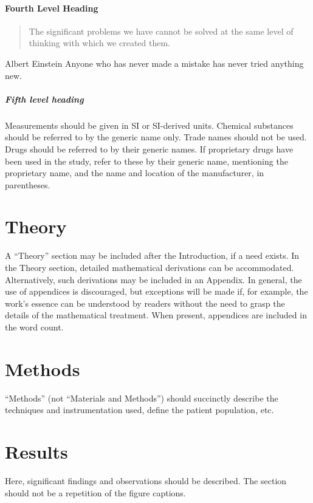 \documentclass[num-refs]{wiley-article}
\begin{document}
\paragraph{Fourth Level Heading}
\begin{quote}
The significant problems we have cannot be solved at the same level of thinking with which we created them.
\end{quote}

\begin{epigraph}{Albert Einstein}
Anyone who has never made a mistake has never tried anything new.
\end{epigraph}

\subparagraph{Fifth level heading}
Measurements should be given in SI or SI-derived units.
Chemical substances should be referred to by the generic name only. 
Trade names should not be used. 
Drugs should be referred to by their generic names. 
If proprietary drugs have been used in the study, refer to these by their generic name, mentioning the proprietary name, and the name and location of the manufacturer, in parentheses.

\section{Theory}
A “Theory” section may be included after the Introduction, if a need exists. 
In the Theory section, detailed mathematical derivations can be accommodated. 
Alternatively, such derivations may be included in an Appendix. 
In general, the use of appendices is discouraged, but exceptions will be made if, for example, the work’s essence can be understood by readers without the need to grasp the details of the mathematical treatment. 
When present, appendices are included in the word count.

\section{Methods}
“Methods” (not “Materials and Methods”) should succinctly describe the techniques and instrumentation used, define the patient population, etc.

\section{Results}
Here, significant findings and observations should be described. 
The section should not be a repetition of the figure captions.
\end{document}
